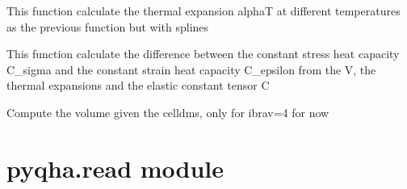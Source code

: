 \documentclass[letterpaper,10pt,english]{sphinxmanual}
\begin{document}
\begin{fulllineitems}
\label{pyqha:pyqha.properties_anis.compute_alpha_splines}
This function calculate the thermal expansion alphaT at different temperatures
as the previous function but with splines

\end{fulllineitems}


\begin{fulllineitems}
\label{pyqha:pyqha.properties_anis.compute_heat_capacity}
This function calculate the difference between the constant stress heat capacity
C\_sigma and the constant strain heat capacity C\_epsilon from the V, the thermal
expansions and the elastic constant tensor C

\end{fulllineitems}


\begin{fulllineitems}
\label{pyqha:pyqha.properties_anis.compute_volume}
Compute the volume given the celldms, only for ibrav=4 for now

\end{fulllineitems}



\section{pyqha.read module}
\label{pyqha:pyqha-read-module}\label{pyqha:module-pyqha.read}
\end{document}
